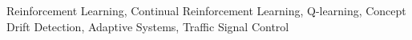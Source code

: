 \documentclass[10pt, conference, ]{IEEEtran}
\begin{document}
\begin{IEEEkeywords}
Reinforcement Learning,  
Continual Reinforcement Learning,  
Q-learning,  
Concept Drift Detection,  
Adaptive Systems,  
Traffic Signal Control
\end{IEEEkeywords}









\printbibliography
\end{document}
